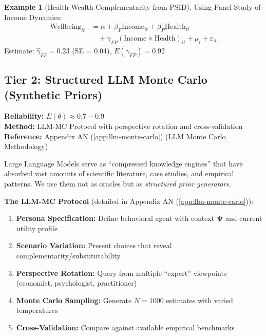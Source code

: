 \documentclass[11pt,a4paper]{article}
\theoremstyle{definition}
\newtheorem{example}{Example}[section]
\begin{document}
\begin{example}[Health-Wealth Complementarity from PSID]
Using Panel Study of Income Dynamics:
\begin{align}
\text{Wellbeing}_{it} &= \alpha + \beta_F \text{Income}_{it} + \beta_P \text{Health}_{it} \nonumber \\
&\quad + \gamma_{FP} (\text{Income} \times \text{Health})_{it} + \mu_i + \varepsilon_{it}
\end{align}
Estimate: $\hat{\gamma}_{FP} = 0.23$ (SE = 0.04), $E(\gamma_{FP}) = 0.92$
\end{example}

\subsection{Tier 2: Structured LLM Monte Carlo (Synthetic Priors)}

\begin{tcolorbox}[colback=yellow!5!white, colframe=yellow!75!black]
\textbf{Reliability:} $E(\theta) \approx 0.7 - 0.9$ \\
\textbf{Method:} LLM-MC Protocol with perspective rotation and cross-validation \\
\textbf{Reference:} Appendix AN (\ref{app:llm-monte-carlo}) (LLM Monte Carlo Methodology)
\end{tcolorbox}

Large Language Models serve as ``compressed knowledge engines'' that have 
absorbed vast amounts of scientific literature, case studies, and empirical 
patterns. We use them not as oracles but as \textit{structured prior generators}.

\textbf{The LLM-MC Protocol} (detailed in Appendix AN (\ref{app:llm-monte-carlo})):
\begin{enumerate}
    \item \textbf{Persona Specification:} Define behavioral agent with context 
    $\boldsymbol{\Psi}$ and current utility profile
    \item \textbf{Scenario Variation:} Present choices that reveal 
    complementarity/substitutability
    \item \textbf{Perspective Rotation:} Query from multiple ``expert'' viewpoints 
    (economist, psychologist, practitioner)
    \item \textbf{Monte Carlo Sampling:} Generate $N = 1000$ estimates with 
    varied temperatures
    \item \textbf{Cross-Validation:} Compare against available empirical benchmarks
\end{enumerate}
\end{document}
